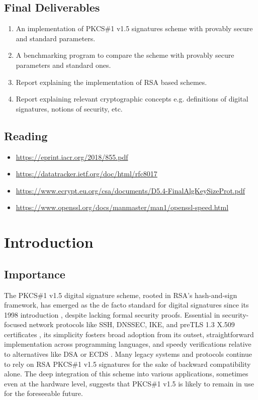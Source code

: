 \documentclass[]{final_report}
\theoremstyle{definition}
\begin{document}
{\section*{Final Deliverables}
\begin{enumerate}
    \item An implementation of PKCS\#1 v1.5 signatures scheme with provably secure and standard parameters.
    \item A benchmarking program to compare the scheme with provably secure parameters and standard ones.
    \item Report explaining the implementation of RSA based schemes.
    \item Report explaining relevant cryptographic concepts e.g. definitions of digital signatures, notions of security, etc.
\end{enumerate}

\section*{Reading}
\begin{itemize}
    \item \href{https://eprint.iacr.org/2018/855.pdf}{https://eprint.iacr.org/2018/855.pdf}
    \item \href{https://datatracker.ietf.org/doc/html/rfc8017}{https://datatracker.ietf.org/doc/html/rfc8017}
    \item \href{https://www.ecrypt.eu.org/csa/documents/D5.4-FinalAlgKeySizeProt.pdf}{https://www.ecrypt.eu.org/csa/documents/D5.4-FinalAlgKeySizeProt.pdf}
    \item \href{https://www.openssl.org/docs/manmaster/man1/openssl-speed.html}{https://www.openssl.org/docs/manmaster/man1/openssl-speed.html}
\end{itemize}
}

\chapter{Introduction}




\section{Importance}

The PKCS\#1 v1.5 digital signature scheme, rooted in RSA's hash-and-sign framework, has emerged as the de facto standard for digital signatures since its 1998 introduction \cite{rfc2313}, despite lacking formal security proofs. Essential in security-focused network protocols like SSH, DNSSEC, IKE, and pre\-TLS 1.3 X.509 certificates \cite{schaad2005additional}, its simplicity fosters broad adoption from its outset, straightforward implementation across programming languages, and speedy verifications relative to alternatives like DSA or ECDS  \cite{jager2018security}. Many legacy systems and protocols continue to rely on RSA PKCS\#1 v1.5 signatures for the sake of backward compatibility alone. The deep integration of this scheme into various applications, sometimes even at the hardware level, suggests that PKCS\#1 v1.5 is likely to remain in use for the foreseeable future.
\end{document}
